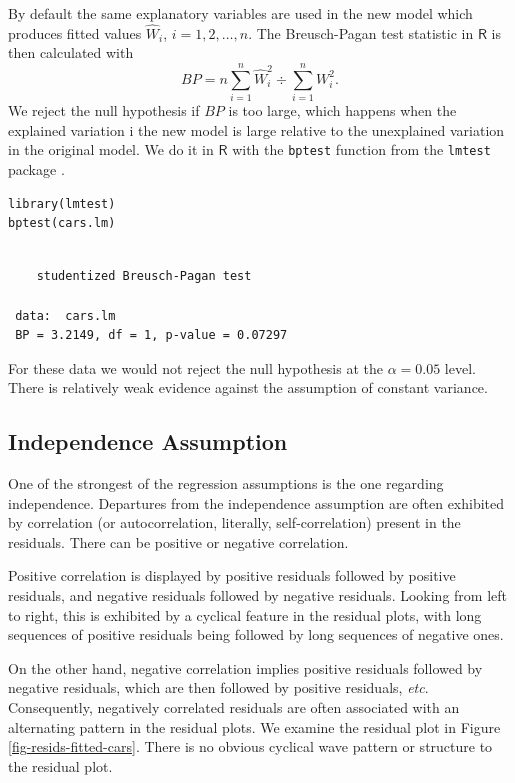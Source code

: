 \documentclass[captions=tableheading]{scrbook}
\begin{document}
By default the same explanatory variables are used in the new model which produces fitted values \(\hat{W}_{i}\), \(i=1,2,\ldots,n\). The Breusch-Pagan test statistic in \(\mathsf{R}\) is then calculated with 
\begin{equation}
BP=n\sum_{i=1}^{n}\hat{W}_{i}^{2}\div\sum_{i=1}^{n}W_{i}^{2}.
\end{equation}
We reject the null hypothesis if \(BP\) is too large, which happens when the explained variation i the new model is large relative to the unexplained variation in the original model.
We do it in \(\mathsf{R}\) with the \texttt{bptest} function from the \texttt{lmtest} package \cite{Zeileislmtest}. 

\begin{verbatim}
library(lmtest)
bptest(cars.lm)
\end{verbatim}

\begin{verbatim}
 
 	studentized Breusch-Pagan test
 
 data:  cars.lm 
 BP = 3.2149, df = 1, p-value = 0.07297
\end{verbatim}

For these data we would not reject the null hypothesis at the \(\alpha=0.05\) level. There is relatively weak evidence against the assumption of constant variance. 
\subsection{Independence Assumption}
\label{sec-11-4-3}
\label{sub-Independence-Assumption}


One of the strongest of the regression assumptions is the one regarding independence. Departures from the independence assumption are often exhibited by correlation (or autocorrelation, literally, self-correlation) present in the residuals. There can be positive or negative correlation.

Positive correlation is displayed by positive residuals followed by positive residuals, and negative residuals followed by negative residuals. Looking from left to right, this is exhibited by a cyclical feature in the residual plots, with long sequences of positive residuals being followed by long sequences of negative ones.

On the other hand, negative correlation implies positive residuals followed by negative residuals, which are then followed by positive residuals, \emph{etc}. Consequently, negatively correlated residuals are often associated with an alternating pattern in the residual plots. We examine the residual plot in Figure \ref{fig-resids-fitted-cars}. There is no obvious cyclical wave pattern or structure to the residual plot. 
\end{document}
